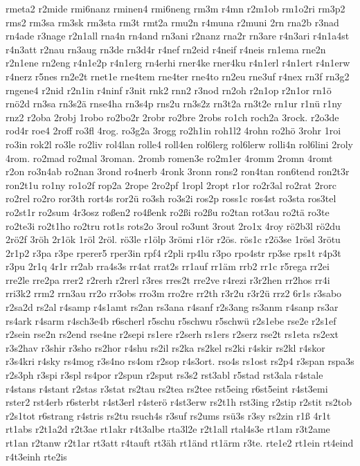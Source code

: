 {rmeta2
r2mide
rmi6nanz
rminen4
rmi6neng
rm3m
r4mn
r2m1ob
rm1o2ri
rm3p2
rms2
rm3sa
rm3sk
rm3sta
rm3t
rmt2a
rmu2n
r4muna
r2muni
2rn
rna2b
r3nad
rn4ade
r3nage
r2n1all
rna4n
rn4and
rn3ani
r2nanz
rna2r
rn3are
r4n3ari
r4n1a4st
r4n3att
r2nau
rn3aug
rn3de
rn3d4r
r4nef
rn2eid
r4neif
r4neis
rn1ema
rne2n
r2n1ene
rn2eng
r4n1e2p
r4n1erg
rn4erhi
rner4ke
rner4ku
r4n1erl
r4n1ert
r4n1erw
r4nerz
r5nes
rn2e2t
rnet1e
rne4tem
rne4ter
rne4to
rn2eu
rne3uf
r4nex
rn3f
rn3g2
rngene4
r2nid
r2n1in
r4ninf
r3nit
rnk2
rnn2
r3nod
rn2oh
r2n1op
r2n1or
rn1ö
rnö2d
rn3sa
rn3s2ä
rnse4ha
rn3s4p
rns2u
rn3s2z
rn3t2a
rn3t2e
rn1ur
r1nü
r1ny
rnz2
r2oba
2robj
1robo
ro2bo2r
2robr
ro2bre
2robs
ro1ch
roch2a
3rock.
r2o3de
rod4r
roe4
2roff
ro3fl
4rog.
ro3g2a
3rogg
ro2h1in
roh1l2
4rohn
ro2hö
3rohr
1roi
ro3in
rok2l
ro3le
ro2liv
rol4lan
rolle4
roll4en
rol6lerg
rol6lerw
rolli4n
rol6lini
2roly
4rom.
ro2mad
ro2mal
3roman.
2romb
romen3e
ro2m1er
4romm
2romn
4romt
r2on
ro3n4ab
ro2nan
3rond
ro4nerb
4ronk
3ronn
rons2
ron4tan
ron6tend
ron2t3r
ron2t1u
ro1ny
ro1o2f
rop2a
2rope
2ro2pf
1ropl
2ropt
r1or
ro2r3al
ro2rat
2rorc
ro2rel
ro2ro
ror3th
rort4s
ror2ü
ro3sh
ro3s2i
ros2p
ross1c
ros4st
ro3sta
ros3tel
ro2st1r
ro2sum
4r3osz
roßen2
ro4ßenk
ro2ßi
ro2ßu
ro2tan
rot3au
ro2tä
ro3te
ro2te3i
ro2t1ho
ro2tru
rot1s
rots2o
3roul
ro3unt
3rout
2ro1x
4roy
rö2b3l
rö2du
2rö2f
3röh
2r1ök
1röl
2röl.
rö3le
r1ölp
3römi
r1ör
r2ös.
rös1c
r2ö3se
1rösl
3rötu
2r1p2
r3pa
r3pe
rperer5
rper3in
rpf4
r2pli
rp4lu
r3po
rpo4str
rp3se
rps1t
r4p3t
r3pu
2r1q
4r1r
rr2ab
rra4s3s
rr4at
rrat2s
rr1auf
rr1äm
rrb2
rr1c
r5rega
rr2ei
rre2le
rre2pa
rrer2
r2rerh
r2rerl
r3res
rres2t
rre2ve
r4rezi
r3r2hen
rr2hos
rr4i
rri3k2
rrm2
rrn3au
rr2o
rr3obs
rro3m
rro2re
rr2th
r3r2u
r3r2ü
rrz2
6r1s
r3sabo
r2sa2d
rs2al
r4samp
r4s1amt
rs2an
rs3ana
r4sanf
r2s3ang
rs3anm
r4sanp
rs3ar
rs4ark
r4sarm
r4sch3e4b
r6scherl
r5schu
r5schwu
r5schwü
r2s1ebe
rse2e
r2s1ef
r2sein
rse2n
rs2end
rse4ne
r2sepi
rs1ere
r2serh
rs1ers
r2serz
rse2t
rs1eta
rs2ext
r3s2hav
r3shir
r3sho
rs2hor
r4shu
rs2il
rs2ka
rs2kel
rs2ki
r4skir
rs2kl
r4skor
r3s4kri
r4sky
rs4mog
r3s4no
rs4om
r2sop
r4s3ort.
rso4s
rs1ost
rs2p4
r3span
rspa3s
r2s3ph
r3spi
r3spl
rs4por
r2spun
r2sput
rs3s2
rst3abl
r5stad
rst3ala
r4stale
r4stans
r4stant
r2stas
r3stat
rs2tau
rs2tea
rs2tee
rst5eing
r6st5eint
r4st3emi
rster2
rst4erb
r6sterbt
r4st3erl
r4sterö
r4st3erw
rs2t1h
rst3ing
r2stip
r2stit
rs2tob
r2s1tot
r6strang
r4stris
rs2tu
rsuch4s
r3suf
rs2ums
rsü3s
r3sy
rs2zin
r1ß
4r1t
rt1abs
r2t1a2d
r2t3ae
rt1akr
r4t3albe
rta3l2e
r2t1all
rtal4s3e
rt1am
r3t2ame
rt1an
r2tanw
r2t1ar
rt3att
r4tauft
rt3äh
rt1änd
rt1ärm
r3te.
rte1e2
rt1ein
rt4eind
r4t3einh
rte2is
}
